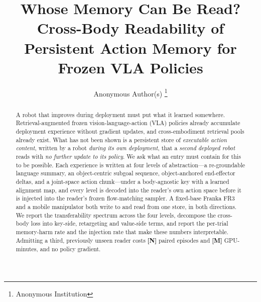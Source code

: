 \documentclass[letterpaper, 10 pt, conference]{ieeeconf}
\title{\LARGE \bf
Whose Memory Can Be Read? Cross-Body Readability of\\
Persistent Action Memory for Frozen VLA Policies
}
\author{Anonymous Author(s)%
\thanks{Anonymous Institution}%
}
\newcommand{\todo}[1]{\textbf{[#1]}}
\begin{document}
\maketitle
\thispagestyle{empty}
\pagestyle{empty}

\begin{abstract}
A robot that improves during deployment must put what it learned somewhere.
Retrieval-augmented frozen vision-language-action (VLA) policies already
accumulate deployment experience without gradient updates, and cross-embodiment
retrieval pools already exist. What has not been shown is a persistent store of
\emph{executable action content}, written by a robot \emph{during its own
deployment}, that a \emph{second deployed robot} reads with \emph{no further
update to its policy}. We ask what an entry must contain for this to be
possible. Each experience is written at four levels of abstraction---a
re-groundable language summary, an object-centric subgoal sequence,
object-anchored end-effector deltas, and a joint-space action chunk---under a
body-agnostic key with a learned alignment map, and every level is decoded into
the reader's own action space before it is injected into the reader's frozen
flow-matching sampler. A fixed-base Franka FR3 and a mobile manipulator both
write to and read from one store, in both directions. We report the
transferability spectrum across the four levels, decompose the cross-body loss
into key-side, retargeting and value-side terms, and report the per-trial
memory-harm rate and the injection rate that make these numbers interpretable.
Admitting a third, previously unseen reader costs \todo{N} paired episodes and
\todo{M} GPU-minutes, and no policy gradient.
\end{abstract}

\end{document}
